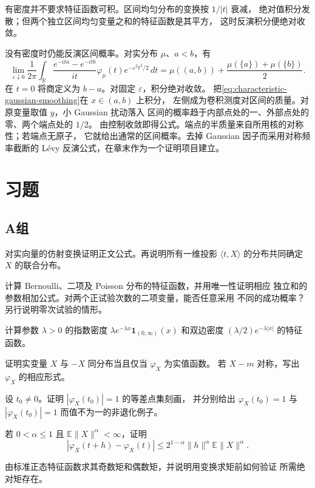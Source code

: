 有密度并不要求特征函数可积。区间均匀分布的变换按 $1/|t|$ 衰减，
绝对值积分发散；但两个独立区间均匀变量之和的特征函数是其平方，
这时反演积分便绝对收敛。

没有密度时仍能反演区间概率。对实分布 $\mu$、$a<b$，有
\begin{equation}
\label{eq:gaussian-levy-interval-inversion}
 \lim_{\varepsilon\downarrow0}\frac1{2\pi}\int_{\mathbb R}
 \frac{e^{-ita}-e^{-itb}}{it}\varphi_\mu(t)e^{-\varepsilon^2t^2/2}\,dt
 =\mu((a,b))+\frac{\mu(\{a\})+\mu(\{b\})}{2}.
\end{equation}
在 $t=0$ 将商定义为 $b-a$。对固定 $\varepsilon$，积分绝对收敛。
把\eqref{eq:characteristic-gaussian-smoothing}在 $x\in(a,b)$ 上积分，
左侧成为卷积测度对区间的质量。对原变量取值 $y$，小 Gaussian 扰动落入
区间的概率趋于内部点处的一、外部点处的零、两个端点处的 $1/2$。
由控制收敛即得公式。端点的半质量来自所用核的对称性；若端点无原子，
它就给出通常的区间概率。去掉 Gaussian 因子而采用对称频率截断的
Lévy 反演公式，在章末作为一个证明项目建立。

\section*{习题}
\subsection*{A组}
\begin{enumerate}[label=\textbf{\thechapter.\arabic*.}]
对实向量的仿射变换证明正文公式。再说明所有一维投影
$\langle t,X\rangle$ 的分布共同确定 $X$ 的联合分布。

计算 Bernoulli、二项及 Poisson 分布的特征函数，并用唯一性证明相应
独立和的参数相加公式。对两个正试验次数的二项变量，能否任意采用
不同的成功概率？另行说明零次试验的情形。

计算参数 $\lambda>0$ 的指数密度
$\lambda e^{-\lambda x}\mathbf1_{(0,\infty)}(x)$ 和双边密度
$(\lambda/2)e^{-\lambda|x|}$ 的特征函数。

证明实变量 $X$ 与 $-X$ 同分布当且仅当 $\varphi_X$ 为实值函数。
若 $X-m$ 对称，写出 $\varphi_X$ 的相应形式。

设 $t_0\ne0$。证明 $|\varphi_X(t_0)|=1$ 的等差点集刻画，
并分别给出 $\varphi_X(t_0)=1$ 与 $|\varphi_X(t_0)|=1$ 而值不为一的非退化例子。

若 $0<\alpha\le1$ 且 $\mathbb E\|X\|^\alpha<\infty$，证明
\[
 |\varphi_X(t+h)-\varphi_X(t)|
 \le 2^{1-\alpha}\|h\|^\alpha\mathbb E\|X\|^\alpha.
\]

由标准正态特征函数求其奇数矩和偶数矩，并说明用变换求矩前如何验证
所需绝对矩存在。
\end{enumerate}

